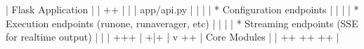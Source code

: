 \documentclass[a4paper,11pt,english,openany,oneside]{sphinxmanual}
\begin{document}
\begin{sphinxVerbatim}[commandchars=\\\{\}]
|                     Flask Application                       |
|  +\PYGZhy{}\PYGZhy{}\PYGZhy{}\PYGZhy{}\PYGZhy{}\PYGZhy{}\PYGZhy{}\PYGZhy{}\PYGZhy{}\PYGZhy{}\PYGZhy{}\PYGZhy{}\PYGZhy{}\PYGZhy{}\PYGZhy{}\PYGZhy{}\PYGZhy{}\PYGZhy{}\PYGZhy{}\PYGZhy{}\PYGZhy{}\PYGZhy{}\PYGZhy{}\PYGZhy{}\PYGZhy{}\PYGZhy{}\PYGZhy{}\PYGZhy{}\PYGZhy{}\PYGZhy{}\PYGZhy{}\PYGZhy{}\PYGZhy{}\PYGZhy{}\PYGZhy{}\PYGZhy{}\PYGZhy{}\PYGZhy{}\PYGZhy{}\PYGZhy{}\PYGZhy{}\PYGZhy{}\PYGZhy{}\PYGZhy{}\PYGZhy{}\PYGZhy{}\PYGZhy{}\PYGZhy{}\PYGZhy{}\PYGZhy{}\PYGZhy{}\PYGZhy{}\PYGZhy{}\PYGZhy{}\PYGZhy{}+  |
|  |                    app/api.py                         |  |
|  |  * Configuration endpoints                            |  |
|  |  * Execution endpoints (run\PYGZhy{}one, run\PYGZhy{}averager, etc)   |  |
|  |  * Streaming endpoints (SSE for real\PYGZhy{}time output)     |  |
|  +\PYGZhy{}\PYGZhy{}\PYGZhy{}\PYGZhy{}\PYGZhy{}\PYGZhy{}\PYGZhy{}\PYGZhy{}\PYGZhy{}\PYGZhy{}\PYGZhy{}\PYGZhy{}\PYGZhy{}\PYGZhy{}\PYGZhy{}\PYGZhy{}\PYGZhy{}\PYGZhy{}\PYGZhy{}\PYGZhy{}\PYGZhy{}\PYGZhy{}\PYGZhy{}\PYGZhy{}\PYGZhy{}\PYGZhy{}\PYGZhy{}+\PYGZhy{}\PYGZhy{}\PYGZhy{}\PYGZhy{}\PYGZhy{}\PYGZhy{}\PYGZhy{}\PYGZhy{}\PYGZhy{}\PYGZhy{}\PYGZhy{}\PYGZhy{}\PYGZhy{}\PYGZhy{}\PYGZhy{}\PYGZhy{}\PYGZhy{}\PYGZhy{}\PYGZhy{}\PYGZhy{}\PYGZhy{}\PYGZhy{}\PYGZhy{}\PYGZhy{}\PYGZhy{}\PYGZhy{}\PYGZhy{}+  |
+\PYGZhy{}\PYGZhy{}\PYGZhy{}\PYGZhy{}\PYGZhy{}\PYGZhy{}\PYGZhy{}\PYGZhy{}\PYGZhy{}\PYGZhy{}\PYGZhy{}\PYGZhy{}\PYGZhy{}\PYGZhy{}\PYGZhy{}\PYGZhy{}\PYGZhy{}\PYGZhy{}\PYGZhy{}\PYGZhy{}\PYGZhy{}\PYGZhy{}\PYGZhy{}\PYGZhy{}\PYGZhy{}\PYGZhy{}\PYGZhy{}\PYGZhy{}\PYGZhy{}\PYGZhy{}|\PYGZhy{}\PYGZhy{}\PYGZhy{}\PYGZhy{}\PYGZhy{}\PYGZhy{}\PYGZhy{}\PYGZhy{}\PYGZhy{}\PYGZhy{}\PYGZhy{}\PYGZhy{}\PYGZhy{}\PYGZhy{}\PYGZhy{}\PYGZhy{}\PYGZhy{}\PYGZhy{}\PYGZhy{}\PYGZhy{}\PYGZhy{}\PYGZhy{}\PYGZhy{}\PYGZhy{}\PYGZhy{}\PYGZhy{}\PYGZhy{}\PYGZhy{}\PYGZhy{}\PYGZhy{}+
                               |
                               v
+\PYGZhy{}\PYGZhy{}\PYGZhy{}\PYGZhy{}\PYGZhy{}\PYGZhy{}\PYGZhy{}\PYGZhy{}\PYGZhy{}\PYGZhy{}\PYGZhy{}\PYGZhy{}\PYGZhy{}\PYGZhy{}\PYGZhy{}\PYGZhy{}\PYGZhy{}\PYGZhy{}\PYGZhy{}\PYGZhy{}\PYGZhy{}\PYGZhy{}\PYGZhy{}\PYGZhy{}\PYGZhy{}\PYGZhy{}\PYGZhy{}\PYGZhy{}\PYGZhy{}\PYGZhy{}\PYGZhy{}\PYGZhy{}\PYGZhy{}\PYGZhy{}\PYGZhy{}\PYGZhy{}\PYGZhy{}\PYGZhy{}\PYGZhy{}\PYGZhy{}\PYGZhy{}\PYGZhy{}\PYGZhy{}\PYGZhy{}\PYGZhy{}\PYGZhy{}\PYGZhy{}\PYGZhy{}\PYGZhy{}\PYGZhy{}\PYGZhy{}\PYGZhy{}\PYGZhy{}\PYGZhy{}\PYGZhy{}\PYGZhy{}\PYGZhy{}\PYGZhy{}\PYGZhy{}\PYGZhy{}\PYGZhy{}+
|                      Core Modules                           |
|  +\PYGZhy{}\PYGZhy{}\PYGZhy{}\PYGZhy{}\PYGZhy{}\PYGZhy{}\PYGZhy{}\PYGZhy{}\PYGZhy{}\PYGZhy{}\PYGZhy{}\PYGZhy{}\PYGZhy{}\PYGZhy{}\PYGZhy{}\PYGZhy{}+  +\PYGZhy{}\PYGZhy{}\PYGZhy{}\PYGZhy{}\PYGZhy{}\PYGZhy{}\PYGZhy{}\PYGZhy{}\PYGZhy{}\PYGZhy{}\PYGZhy{}\PYGZhy{}\PYGZhy{}\PYGZhy{}\PYGZhy{}\PYGZhy{}+  +\PYGZhy{}\PYGZhy{}\PYGZhy{}\PYGZhy{}\PYGZhy{}\PYGZhy{}\PYGZhy{}\PYGZhy{}\PYGZhy{}\PYGZhy{}\PYGZhy{}\PYGZhy{}\PYGZhy{}\PYGZhy{}\PYGZhy{}+  |

\end{sphinxVerbatim}
\end{document}
